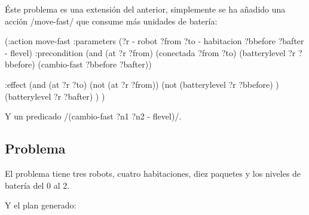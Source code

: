 \documentclass[	DIV=calc,%
							paper=a4,%
							fontsize=11pt]{scrartcl}	 					%
\newcommand{\lispscript}[2]{
    \myLisp[label=#2]{#1}
}
\begin{document}
Éste problema es una extensión del anterior, simplemente se ha añadido una acción \newlispinline/move-fast/ que consume más unidades de batería:

\begin{newlispcode}
	(:action move-fast
	  :parameters (?r - robot ?from ?to - habitacion ?bbefore ?bafter - flevel)
	  :precondition (and
	                  (at ?r ?from)
	                  (conectada ?from ?to)
	                  (batterylevel ?r ?bbefore)
	                  (cambio-fast ?bbefore ?bafter))

	  :effect (and
	            (at ?r ?to)
	            (not (at ?r ?from))
	            (not (batterylevel ?r ?bbefore) )
	            (batterylevel ?r ?bafter)
	            )
	)
\end{newlispcode}

Y un predicado \newlispinline/(cambio-fast ?n1 ?n2 - flevel)/.

\subsection{Problema}
\label{sub:Problema}

El problema tiene tres robots, cuatro habitaciones, diez paquetes y los niveles de batería del 0 al 2.

\lispscript{../p1e3.pddl}{p1e3.pddl}

Y el plan generado:
\end{document}
